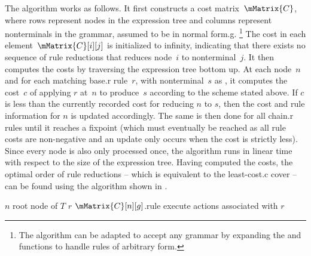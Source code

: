 The algorithm works as follows.
%
It first constructs a cost matrix~$\mMatrix{C}$, where rows represent
\glspl{node} in the \gls{expression tree} and columns represent
\glspl{nonterminal} in the \gls{grammar}, assumed to be in \gls{normal
  form.g}.\!%
%
\footnote{%
  The algorithm can be adapted to accept any \gls{grammar} by expanding the
   and  functions to
  handle \glspl{rule} of arbitrary form.%
}
%
The cost in each element~\mbox{$\mMatrix{C}[i][j]$} is initialized to infinity,
indicating that there exists no sequence of \glspl{rule reduction} that reduces
\gls{node}~$i$ to \gls{nonterminal}~$j$\hspace{-1pt}.
%
It then computes the costs by traversing the \gls{expression tree} bottom up.
%
At each \gls{node}~$n$ and for each matching \gls{base.r} \gls{rule}~$r$\!, with
\gls{nonterminal}~$s$ as , it computes the cost~$c$ of
applying $r$ at~$n$ to produce~$s$ according to the scheme stated above.
%
If $c$ is less than the currently recorded cost for reducing $n$ to
$s$\hspace{-.8pt}, then the cost and \gls{rule} information for $n$ is updated
accordingly.
%
The same is then done for all \gls{chain.r} \glspl{rule} until it reaches a
fixpoint (which must eventually be reached as all \gls{rule} costs are
non-negative and an update only occurs when the cost is strictly less).
%
Since every \gls{node} is also only processed once, the algorithm runs in linear
time with respect to the size of the \gls{expression tree}.
%
Having computed the costs, the optimal order of \glspl{rule reduction} -- which
is equivalent to the \gls{least-cost.c} \gls{cover} -- can be found using the
algorithm shown in .

\begin{algorithm}[t]
  {%
    $n$ \Assign root node of $T$\;
    $r$ \Assign $\mMatrix{C}[n][g]$.rule\;
    execute actions associated with $r$\;
  }

  \caption[Algorithm for selecting the optimal sequence of rules]%
          {%
            Selects optimal sequence of rules that reduces a given expression
            tree to a given nonterminal, based on costs computed
            by %
          }
\end{algorithm}


